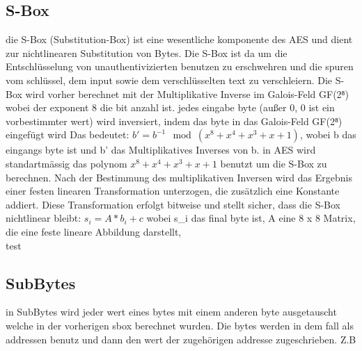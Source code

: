\subsection{S-Box}
die S-Box (Substitution-Box) ist eine wesentliche komponente des AES und dient zur nichtlinearen Substitution von Bytes. 
Die S-Box ist da um die Entschlüsselung von unauthentivizierten benutzen zu erschwehren und die spuren vom schlüssel, dem 
input sowie dem verschlüsselten text zu verschleiern. Die S-Box wird vorher berechnet mit der Multiplikative Inverse im Galois-Feld GF(2⁸) 
wobei der exponent 8 die bit anzahl ist. jedes eingabe byte (außer 0, 0 ist ein vorbestimmter wert) wird inversiert, indem das byte in das Galois-Feld GF(2⁸) eingefügt wird 
Das bedeutet: $b' = b^{-1} \mod (x^8 + x^4 + x^3 + x + 1)$, wobei b das eingangs byte ist und b' das Multiplikatives Inverses von b. in AES wird standartmässig 
das polynom $x^8 + x^4 + x^3 + x + 1$ benutzt um die S-Box zu berechnen. Nach der Bestimmung des multiplikativen Inversen wird das 
Ergebnis einer festen linearen Transformation unterzogen, die zusätzlich eine Konstante addiert. Diese Transformation erfolgt bitweise und stellt sicher, dass die S-Box 
nichtlinear bleibt: $s_i = A * b_i +c$ wobei s_i das final byte ist, A eine 8 x 8 Matrix, die eine feste lineare Abbildung darstellt,\\
test\\



\subsection{SubBytes}
in SubBytes wird jeder wert eines bytes mit einem anderen byte ausgetauscht welche in der vorherigen sbox berechnet wurden.
 Die bytes werden in dem fall als addressen benutz und dann den wert der zugehörigen addresse zugeschrieben. Z.B \\
 \begin{table}[H]
    
    \caption{Beispiel einer S-Box im AES-Algorithmus}
\end{table}


